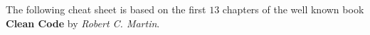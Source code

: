 
The following cheat sheet is based on the first $13$ chapters of the well known book \textbf{Clean Code}
by \textit{Robert C. Martin}.